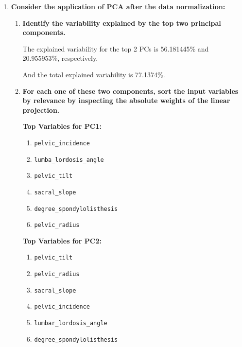 \documentclass[12pt]{article}
\begin{document}
\begin{enumerate}[leftmargin=\labelsep]
  \item \textbf{Consider the application of PCA after the data normalization:}

        \begin{enumerate}
          \item \textbf{Identify the variability explained by the top two principal components.}

                \vskip 0.3cm
                

                The explained variability for the top 2 PCs is 56.181445\% and 20.955953\%, respectively.

                And the total explained variability is 77.1374\%.

          \item \textbf{For each one of these two components, sort the input variables by relevance by
                  inspecting the absolute weights of the linear projection.}

                \vskip 0.3cm
                


                \begin{minipage}[t]{0.45\linewidth}
                  \textbf{Top Variables for PC1:}
                  \begin{enumerate}[label=\arabic*.]
                    \item \texttt{pelvic\_incidence}
                    \item \texttt{lumba\_lordosis\_angle}
                    \item \texttt{pelvic\_tilt}
                    \item \texttt{sacral\_slope}
                    \item \texttt{degree\_spondylolisthesis}
                    \item \texttt{pelvic\_radius}
                  \end{enumerate}
                \end{minipage}
                \hfill
                \begin{minipage}[t]{0.45\linewidth}
                  \textbf{Top Variables for PC2:}
                  \begin{enumerate}[label=\arabic*.]
                    \item \texttt{pelvic\_tilt}
                    \item \texttt{pelvic\_radius}
                    \item \texttt{sacral\_slope}
                    \item \texttt{pelvic\_incidence}
                    \item \texttt{lumbar\_lordosis\_angle}
                    \item \texttt{degree\_spondylolisthesis}
                  \end{enumerate}
                \end{minipage}



\end{enumerate}
\end{enumerate}
\end{document}
